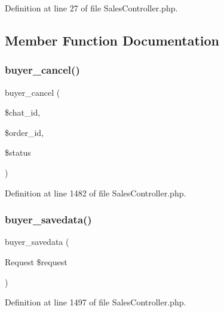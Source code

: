 Definition at line 27 of file Sales\+Controller.\+php.



\subsection{Member Function Documentation}
\mbox{\label{class_responsive_1_1_http_1_1_controllers_1_1_sales_controller_ae6476cb9150ea64e6ace4db49772bdd3}} 
\subsubsection{\texorpdfstring{buyer\_cancel()}{buyer\_cancel()}}
{\footnotesize\ttfamily buyer\+\_\+cancel (\begin{DoxyParamCaption}\item[{}]{\$chat\+\_\+id,  }\item[{}]{\$order\+\_\+id,  }\item[{}]{\$status }\end{DoxyParamCaption})}



Definition at line 1482 of file Sales\+Controller.\+php.

\mbox{\label{class_responsive_1_1_http_1_1_controllers_1_1_sales_controller_acaa311945d5dcb4df3f670f1a719cae7}} 
\subsubsection{\texorpdfstring{buyer\_savedata()}{buyer\_savedata()}}
{\footnotesize\ttfamily buyer\+\_\+savedata (\begin{DoxyParamCaption}\item[{Request}]{\$request }\end{DoxyParamCaption})\hspace{0.3cm}{\ttfamily [protected]}}



Definition at line 1497 of file Sales\+Controller.\+php.

\mbox{\label{class_responsive_1_1_http_1_1_controllers_1_1_sales_controller_a0c07b1ea236beecb7f99bc6b37eeb6f5}} 
